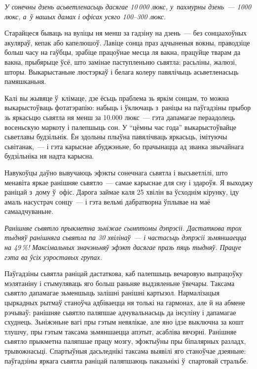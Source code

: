 \emph{У сонечны дзень асьветленасьць дасягае 10\,000 люкс, у~пахмурны дзень~--- 1000 люкс, а~ў нашых дамах і офісах усяго 100--300 люкс.}

Старайцеся бываць на вуліцы ня менш за гадзіну на дзень~--- без сонцаахоўных акуляраў, кепак або капелюшоў. Лавіце сонца праз адчыненыя вокны, праводзіце больш часу на гаўбцы, зрабіце працоўнае месца ля вакна, працуйце тварам да вакна, прыбярыце ўсё, што замінае паступленьню сьвятла: расьліны, жалюзі, шторы. Выкарыстаньне люстэркаў і белага колеру павялічыць асьветленасьць памяшканьня. 


Калі вы жывяце ў~клімаце, дзе ёсьць праблема зь яркім сонцам, то можна выкарыстоўваць фотатэрапію: набыць і ўключаць з~раніцы на паўгадзіны прыбор зь яркасьцю сьвятла ня менш за 10.000 люкс~--- гэта дапамагае пераадолець восеньскую маркоту і палепшыць сон. У ``цёмны час года'' выкарыстоўвайце сьветлавы будзільнік. Ён здольны плыўна павялічваць яркасьць, імітуючы сьвітанак,~--- і гэта карыснае абуджэньне, бо прачынацца ад званка звычайнага будзільніка ня надта карысна.

Навукоўцы даўно вывучаюць эфэкты сонечнага сьвятла і высьветлілі, што менавіта яркае ранішняе сьвятло~--- самае карыснае для сну і здароўя. Я выходжу раніцай з~дому ў~офіс. Дарога займае каля 25 хвілін ва ўсходнім кірунку, іду амаль насустрач сонцу~--- і гэта вельмі дабратворна ўплывае на маё самаадчуваньне.

\emph{Ранішняе сьвятло прыкметна зьніжае сымптомы дэпрэсіі. Дастаткова трох тыдняў ранішняга сьвятла па 30 хвілінаў~--- і частасьць дэпрэсіі зьмяншаецца на 49\,\%! Максімальных значэньняў эфэкт дасягае празь пяць тыдняў. Працуе гэта ва ўсіх узроставых групах.}

Паўгадзіны сьвятла раніцай дастаткова, каб палепшыць вечаровую выпрацоўку мэлятаніну і стымуляваць яго больш раньняе выдзяленьне ўвечары. Таксама сьвятло дапамагае зьменшыць залішні ранішні картызол. Нармалізацыя цыркадных рытмаў станоўча адбіваецца ня толькі на гармонах, але й на абмене рэчываў: ранішняе сьвятло паляпшае адчувальнасьць да інсуліну і дапамагае схуднець. Зьніжэньне вагі пры гэтым невялікае, але яно ідзе выключна за кошт тлушчу, пры гэтым таксама зьмяншаецца апэтыт, асабліва вячэрні. Ранішняе сьвятло прыкметна паляпшае працу мозгу, эфэктыўны пры біпалярных разладх, трывожнасьці. Спартыўныя дасьледнікі таксама выявілі яго станоўчае дзеяньне: паўгадзіны яркага сьвятла раніцай паляпшаюць паказьнікі ў~спартовай стральбе.

